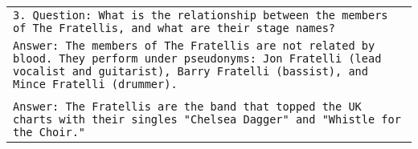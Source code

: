 \begin{table*}
\begin{tabular}{>{\raggedright\arraybackslash\tt}p{}<{}}
 \\
      3. Question: What is the relationship between the members of The Fratellis, and what are their stage names? \\
      Answer: The members of The Fratellis are not related by blood. They perform under pseudonyms: Jon Fratelli (lead vocalist and guitarist), Barry Fratelli (bassist), and Mince Fratelli (drummer). \\
 \\
      Answer: The Fratellis are the band that topped the UK charts with their singles "Chelsea Dagger" and "Whistle for the Choir." \\
      \bottomrule
    \end{tabular}
    \label{tab:fewshot_example}
\end{table*}

